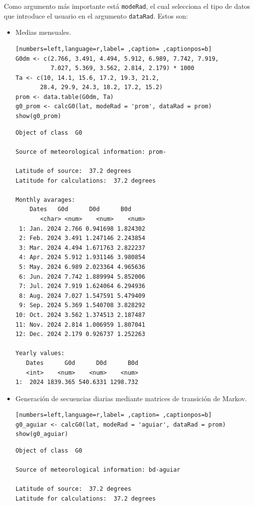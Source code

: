 Como argumento más importante está \texttt{modeRad}, el cual selecciona el tipo de datos que introduce el usuario en el argumento \texttt{dataRad}. Estos son:
\begin{itemize}
\item Medias mensuales.
\begin{lstlisting}[numbers=left,language=r,label= ,caption= ,captionpos=b]
G0dm <- c(2.766, 3.491, 4.494, 5.912, 6.989, 7.742, 7.919,
          7.027, 5.369, 3.562, 2.814, 2.179) * 1000
Ta <- c(10, 14.1, 15.6, 17.2, 19.3, 21.2,
       28.4, 29.9, 24.3, 18.2, 17.2, 15.2)
prom <- data.table(G0dm, Ta) 
g0_prom <- calcG0(lat, modeRad = 'prom', dataRad = prom)
show(g0_prom)
\end{lstlisting}

\begin{verbatim}
Object of class  G0 

Source of meteorological information: prom- 

Latitude of source:  37.2 degrees
Latitude for calculations:  37.2 degrees

Monthly avarages:
	Dates   G0d      D0d      B0d
       <char> <num>    <num>    <num>
 1: Jan. 2024 2.766 0.941698 1.824302
 2: Feb. 2024 3.491 1.247146 2.243854
 3: Mar. 2024 4.494 1.671763 2.822237
 4: Apr. 2024 5.912 1.931146 3.980854
 5: May. 2024 6.989 2.023364 4.965636
 6: Jun. 2024 7.742 1.889994 5.852006
 7: Jul. 2024 7.919 1.624064 6.294936
 8: Aug. 2024 7.027 1.547591 5.479409
 9: Sep. 2024 5.369 1.540708 3.828292
10: Oct. 2024 3.562 1.374513 2.187487
11: Nov. 2024 2.814 1.006959 1.807041
12: Dec. 2024 2.179 0.926737 1.252263

Yearly values:
   Dates      G0d      D0d      B0d
   <int>    <num>    <num>    <num>
1:  2024 1839.365 540.6331 1298.732
\end{verbatim}

\item Generación de secuencias diarias mediante matrices de transición de Markov.
\begin{lstlisting}[numbers=left,language=r,label= ,caption= ,captionpos=b]
g0_aguiar <- calcG0(lat, modeRad = 'aguiar', dataRad = prom)
show(g0_aguiar)
\end{lstlisting}

\begin{verbatim}
Object of class  G0 

Source of meteorological information: bd-aguiar 

Latitude of source:  37.2 degrees
Latitude for calculations:  37.2 degrees


\end{verbatim}
\end{itemize}
